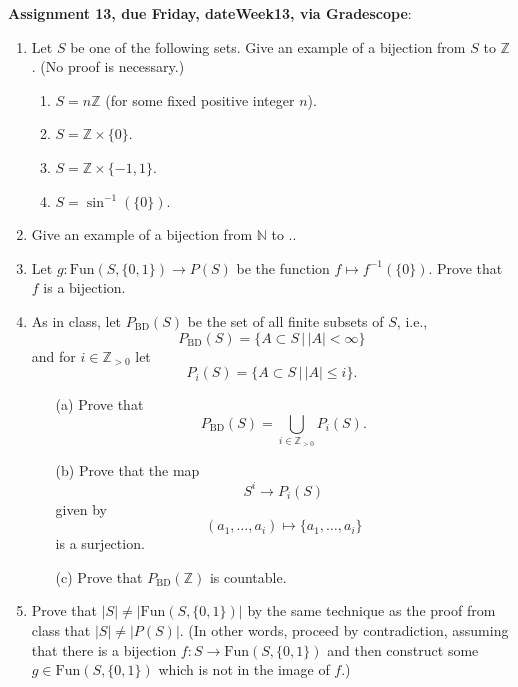\documentclass[12pt]{article}
\newcommand{\Z}{{\mathbb Z}}
\begin{document}
\noindent \textbf{Assignment 13, due Friday, \csname dateWeek13\endcsname, via Gradescope}:




\begin{enumerate}
\item Let $S$ be one of the following sets. Give an example of a bijection from $S$ to $\mathbb{Z}$. (No proof is necessary.)
  \begin{enumerate}
  \item $S = n\mathbb{Z}$ (for some fixed positive integer $n$).
  \item $S = \mathbb{Z} \times \{0\}$.    
  \item $S = \mathbb{Z} \times \{-1,1\}$.
  \item $S = \sin^{-1}(\{0\})$.
  \end{enumerate}

\item Give an example of a bijection from $\mathbb{N}$ to ..
  
\item  Let $g\colon \text{Fun}(S, \{0,1\})  \to P(S)$ be the function $f
\mapsto f^{-1}(\{0\})$. Prove that $f$ is a bijection.\\

\item  As in class, let $P_{\text{BD}}(S)$ be the set of all finite
subsets of $S$, i.e., 
\[
P_{\text{BD}}(S) = \{ A \subset S \,|\, |A| < \infty \}
\]
and for $i \in \Z_{ >  0}$ let 
\[
P_{i}(S) = \{ A \subset S \,|\, |A| \leq i \}.
\]
\begin{itemize}
\item [(a)] Prove that
\[
P_{\text{BD}}(S) = \bigcup_{i \in \Z_{> 0}} P_i(S).
\]
\item [(b)] Prove that the map
\[
 S^i \to P_i(S) 
\]
given by 
\[
(a_1, \ldots, a_i) \mapsto \{a_1,\ldots,a_i\}
\]
is a surjection.
\item [(c)] Prove that $P_{\text{BD}}(\Z)$ is countable.\\
\end{itemize}

\item  Prove that $|S| \neq |\text{Fun}(S, \{0,1\})|$ by the same
technique as the proof from class that $|S| \neq |P(S)|$. (In other
words, proceed by contradiction, assuming that there is a bijection
$f\colon S \to \text{Fun}(S, \{0,1\})$ and then construct some $g \in
\text{Fun}(S, \{0,1\})$ which is not in the image of $f$.)
\end{enumerate}
\end{document}
